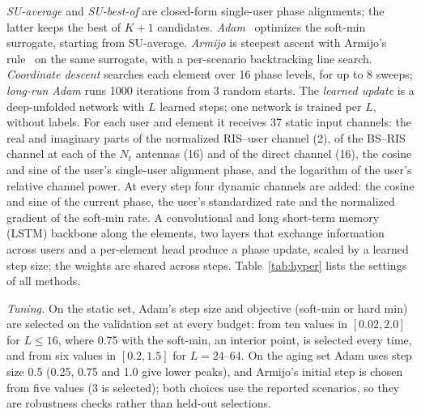 \emph{SU-average} and \emph{SU-best-of} are closed-form single-user phase alignments; the latter keeps the best of $K{+}1$ candidates. \emph{Adam}~\cite{Kingma2015ICLR} optimizes the soft-min surrogate, starting from SU-average. \emph{Armijo} is steepest ascent with Armijo's rule~\cite{Armijo1966PJM} on the same surrogate, with a per-scenario backtracking line search. \emph{Coordinate descent} searches each element over 16 phase levels, for up to 8 sweeps; \emph{long-run Adam} runs 1000 iterations from 3 random starts. The \emph{learned update} is a deep-unfolded network with $L$ learned steps; one network is trained per $L$, without labels. For each user and element it receives 37 static input channels: the real and imaginary parts of the normalized RIS--user channel (2), of the BS--RIS channel at each of the $N_t$ antennas (16) and of the direct channel (16), the cosine and sine of the user's single-user alignment phase, and the logarithm of the user's relative channel power. At every step four dynamic channels are added: the cosine and sine of the current phase, the user's standardized rate and the normalized gradient of the soft-min rate. A convolutional and long short-term memory (LSTM) backbone along the elements, two layers that exchange information across users and a per-element head produce a phase update, scaled by a learned step size; the weights are shared across steps. Table~\ref{tab:hyper} lists the settings of all methods.

\emph{Tuning.} On the static set, Adam's step size and objective (soft-min or hard min) are selected on the validation set at every budget: from ten values in $[0.02, 2.0]$ for $L\le 16$, where 0.75 with the soft-min, an interior point, is selected every time, and from six values in $[0.2, 1.5]$ for $L=24$--$64$. On the aging set Adam uses step size 0.5 (0.25, 0.75 and 1.0 give lower peaks), and Armijo's initial step is chosen from five values (3 is selected); both choices use the reported scenarios, so they are robustness checks rather than held-out selections.

